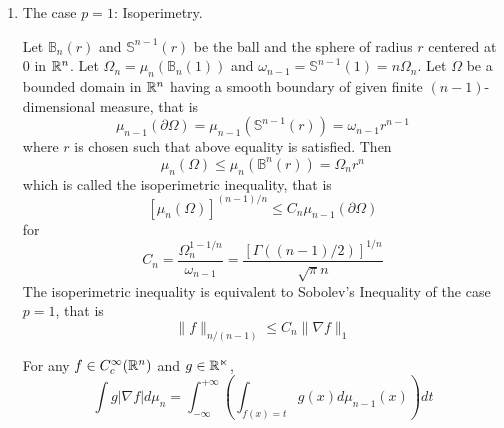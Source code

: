 \begin{enumerate}[label=\Roman*.]
	\item The case $p = 1$: Isoperimetry.

	\noindent Let $\mathbb{B}_n(r)$ and $\mathbb{S}^{n-1}(r)$ be the ball and the sphere of radius $r$ centered at $0$ in $\mathbb{R}^n$. Let $\Omega_n = \mu_n(\mathbb{B}_n(1))$ and $\omega_{n-1} = \mathbb{S}^{n-1}(1) = n\Omega_n$. Let $\Omega$ be a bounded domain in $\mathbb{R}^n$ having a smooth boundary of given finite $(n-1)$-dimensional measure, that is
	\begin{equation*}
		\mu_{n-1}(\partial \Omega)=\mu_{n-1}\left(\mathbb{S}^{n-1}(r)\right)=\omega_{n-1} r^{n-1}
	\end{equation*}
	where $r$ is chosen such that above equality is satisfied. Then
	\begin{equation*}
		\mu_n(\Omega) \leq \mu_n\left(\mathbb{B}^n(r)\right)=\Omega_n r^n
	\end{equation*}
	which is called the isoperimetric inequality, that is
	\begin{equation*}
		\left[\mu_n(\Omega)\right]^{(n-1) / n} \leq C_n \mu_{n-1}(\partial \Omega)
	\end{equation*}
	for
	\begin{equation*}
		C_n=\frac{\Omega_n^{1-1 / n}}{\omega_{n-1}}=\frac{[\Gamma((n-1) / 2)]^{1 / n}}{\sqrt{\pi} n}
	\end{equation*}
	The isoperimetric inequality is equivalent to Sobolev's Inequality of the case $p=1$, that is
	\begin{equation*}
		\|f\|_{n /(n-1)} \leq C_n\|\nabla f\|_1
	\end{equation*}

	\begin{thm}\label{thm:coarea}
		For any $f \in C_c^\infty(\mathbb{R}^n)$ and $g \in \mathbb{\mathbb{R}^n}$,
		\begin{equation*}
			\int g|\nabla f| d \mu_n=\int_{-\infty}^{+\infty}\left(\int_{f(x)=t} g(x) d \mu_{n-1}(x)\right) d t
		\end{equation*}
	\end{thm}


\end{enumerate}
